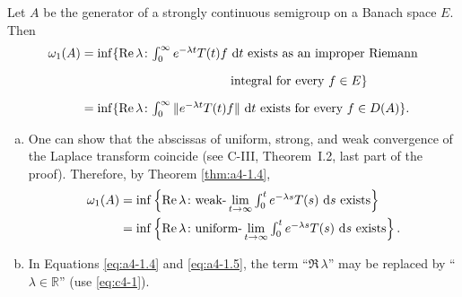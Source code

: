 \begin{theorem}\label{thm:a4-1.4}
Let $A$ be the generator of a strongly continuous semigroup on a Banach space $E$. 
Then
\begin{align}\label{eq:a4-1.4}
\omega_{1}(A) &= \inf\{\Re\,\lambda \colon \textstyle{\int_{0}^{\infty} e^{-\lambda t} T(t)f \,\dt} \text{ exists as an improper Riemann} \\
&\phantom{= \inf\{\Re\,\lambda \colon \int_{0}^{\infty} e^{-\lambda t} T(t)f} \text{integral for every } f \in E\} \notag \\
&= \inf\{\Re\,\lambda \colon \textstyle{\int_{0}^{\infty} \|e^{-\lambda t} T(t)f\| \,\dt} \text{ exists for every } f \in D(A)\}.\notag
\end{align}
\end{theorem}
\begin{remarks*}\label{rem:a4-1.4}

\begin{enumerate}[(a), wide, labelsep=1em]

\item 
One can show that the abscissas of uniform, strong, and weak convergence of the Laplace transform coincide (see C-III, Theorem~I.2, last part of the proof). 
Therefore, by Theorem \ref{thm:a4-1.4},
\begin{align}\label{eq:a4-1.5}
\omega_1(A) &= \inf \left\{ \mathop{}\!\mathrm{Re}\,\lambda\colon\text{weak-} \lim_{t \to \infty} \textstyle{\int_0^t e^{-\lambda s} T(s) \,\mathop{}\!\mathrm{d}{s}} \text{ exists} \right\}
\\
    &= \inf \left\{ \mathop{}\!\mathrm{Re}\,\lambda\colon\text{uniform-} \lim_{t \to \infty} \textstyle{\int_0^t e^{-\lambda s} T(s) \,\mathop{}\!\mathrm{d}{s}} \text{ exists} \right\}.\notag
\end{align}

\item
In Equations \eqref{eq:a4-1.4} and \eqref{eq:a4-1.5}, the term \enquote{$\Re\,\lambda$} may be replaced by \enquote{$\lambda \in \mathbb{R}$} (use \eqref{eq:c4-1}).
\end{enumerate}

\end{remarks*}

